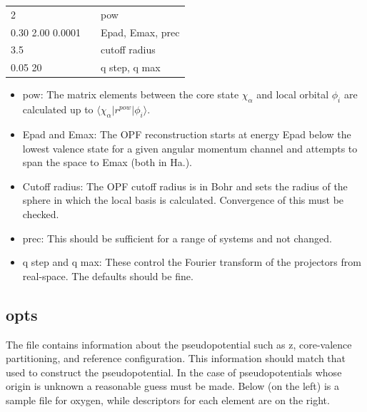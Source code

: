 \documentclass[11pt]{report}
\begin{document}
\begin{center}
\begin{tabular}{| l | c l |}
\hline
2						& &  pow \\
0.30 2.00 0.0001		& & Epad, Emax, prec \\
3.5 					& & cutoff radius \\
0.05 20					& & q step, q max \\
\hline
\end{tabular}
\end{center}

\begin{itemize}
\item pow: The matrix elements between the core state $\chi_\alpha$ and local orbital $\phi_i$ are calculated
 up to $\langle \chi_\alpha \vert r^{pow} \vert \phi_i \rangle$. 
\item Epad and Emax: The OPF reconstruction starts at energy Epad below the lowest valence state for a given angular momentum channel and attempts to span the space to Emax (both in Ha.). 
\item Cutoff radius: The OPF cutoff radius is in Bohr and sets the radius of the sphere in which the local basis is calculated. Convergence of this must be checked. 
\item prec: This should be sufficient for a range of systems and not changed.
\item q step and q max: These control the Fourier transform of the projectors from real-space. The defaults should be fine.
\end{itemize}




\subsection{opts}
\label{opts}
The  file contains information about the pseudopotential such as z, core-valence partitioning, and reference configuration. This information should match that used to construct the pseudopotential. In the case of pseudopotentials 
whose origin is unknown a reasonable guess must be made. Below (on the left) is a sample  file for oxygen, while descriptors for each element are on the right.
\end{document}
